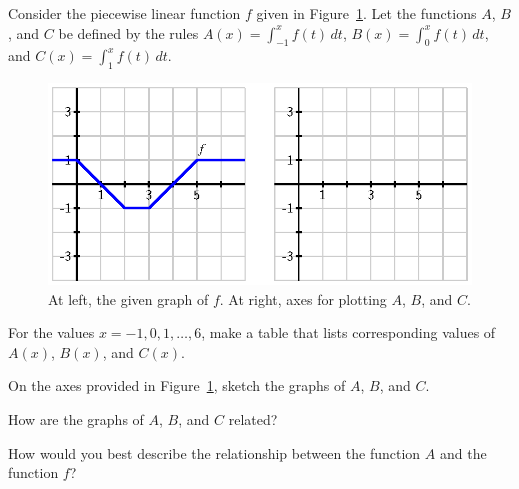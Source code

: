 \begin{exercises}
  \item Consider the piecewise linear function $f$ given in Figure~\ref{F:5.1.Ez3}.  Let the functions $A$, $B$, and $C$ be defined by the rules $A(x) = \int_{-1}^{x} f(t) \, dt$, $B(x) = \int_{0}^{x} f(t) \, dt$, and $C(x) = \int_{1}^{x} f(t) \, dt$.
  \begin{figure}[h]
\begin{center}
\includegraphics{figures/5_1_Ez3.eps}
\caption{At left, the given graph of $f$.  At right, axes for plotting $A$, $B$, and $C$.} \label{F:5.1.Ez3}
\end{center}
\end{figure}
	\ba
		\item For the values $x = -1, 0, 1, \ldots, 6$, make a table that lists corresponding values of $A(x)$, $B(x)$, and $C(x)$.  
		\item On the axes provided in Figure~\ref{F:5.1.Ez3}, sketch the graphs of $A$, $B$, and $C$.
		\item How are the graphs of $A$, $B$, and $C$ related?
		\item How would you best describe the relationship between the function $A$ and the function $f$?
	\ea



\end{exercises}
\afterexercises


